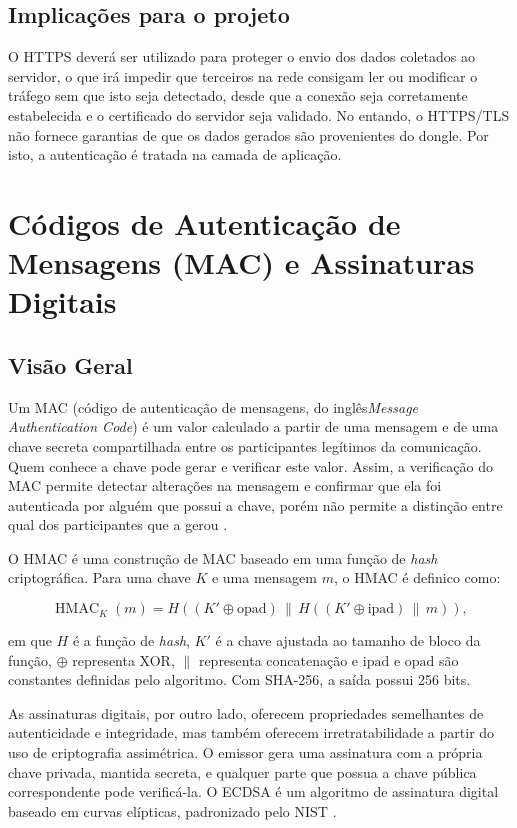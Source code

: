 \subsection{Implicações para o projeto}

O HTTPS deverá ser utilizado para proteger o envio dos dados coletados ao servidor, o que irá impedir que terceiros na rede consigam ler ou modificar o tráfego sem que isto seja detectado, desde que a conexão seja corretamente estabelecida e o certificado do servidor seja validado. No entando, o HTTPS/TLS não fornece garantias de que os dados gerados são provenientes do dongle. Por isto, a autenticação é tratada na camada de aplicação.


\section{Códigos de Autenticação de Mensagens (MAC) e Assinaturas Digitais} \label{sec:conceitos-mac}

\subsection{Visão Geral}
Um MAC (código de autenticação de mensagens, do inglês\textit{Message Authentication Code}) é um valor calculado a partir de uma mensagem e de uma chave secreta compartilhada entre os participantes legítimos da comunicação. Quem conhece a chave pode gerar e verificar este valor. Assim, a verificação do MAC permite detectar alterações na mensagem e confirmar que ela foi autenticada por alguém que possui a chave, porém não permite a distinção entre qual dos participantes que a gerou \cite{RFC2104}.

O HMAC é uma construção de MAC baseado em uma função de \textit{hash} criptográfica. Para uma chave $K$ e uma mensagem $m$, o HMAC é definico como:

\begin{equation}
    \operatorname{HMAC}_{K}(m) =
    H\!\left((K'\oplus\mathrm{opad})\,\|\,
    H\!\left((K'\oplus\mathrm{ipad})\,\|\,m\right)\right),
    \label{eq:conceitos-hmac}
\end{equation}

\noindent em que $H$ é a função de \textit{hash}, $K'$ é a chave ajustada ao tamanho de bloco da função, $\oplus$ representa XOR, $\|$ representa concatenação e $\mathrm{ipad}$ e $\mathrm{opad}$ são constantes definidas pelo algoritmo. Com SHA-256, a saída possui 256 bits.

As assinaturas digitais, por outro lado, oferecem propriedades semelhantes de autenticidade e integridade, mas também oferecem irretratabilidade a partir do uso de criptografia assimétrica. O emissor gera uma assinatura com a própria chave privada, mantida secreta, e qualquer parte que possua a chave pública correspondente pode verificá-la. O ECDSA é um algoritmo de assinatura digital baseado em curvas elípticas, padronizado pelo NIST \cite{FIPS1865}.

